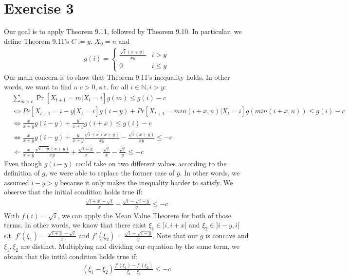 \documentclass[a4paper,german]{article}
\begin{document}
\section*{Exercise 3}
	Our goal is to apply Theorem 9.11, followed by Theorem 9.10. In particular, we define Theorem 9.11's \(C := y\), \(X_0 = n\) and 
	\begin{align*}
		g(i) = \begin{cases}
			\frac{\sqrt i (x+y)}{xy} & i > y \\
			0 & i \leq y
			\end{cases}
	\end{align*}
	Our main concern is to show that Theorem 9.11's inequality holds. In other words, we want to find a \(c > 0\), s.t. for all \(i \in \mathbb{N}, i>y\):
	\begin{align*}
		&\sum_{m>c} \Pr[X_{t+1} = m | X_t = i] g(m) \leq g(i) - c \\
		&\Leftrightarrow Pr[X_{t+1} = i-y|X_t = i] g(i-y) + Pr[X_{t+1} = min(i+x,n) | X_t = i] g(min(i+x,n)) \leq g(i) -c \\
		&\Leftrightarrow \frac{x}{x+y} g(i-y) + \frac{y}{x+y}g(i+x) \leq g(i) -c \\
		&\Leftrightarrow  \frac{x}{x+y} g(i-y) + \frac{y}{x+y}\frac{\sqrt{i+x}(x + y)}{xy} - \frac{\sqrt i (x+y)}{xy}\leq -c \\
		&\Leftarrow \frac{x}{x+y}\frac{\sqrt{i-y}(x+y)}{xy} + \frac{\sqrt{i+x}}{x} - \frac{\sqrt i}{x} - \frac{\sqrt i}{y }\leq -c
	\end{align*}
	Even though \(g(i-y)\) could take on two different values according to the definition of \(g\), we were able to replace the former case of \(g\). In other words, we assumed \(i-y > y\) because it only makes the inequality harder to satisfy. We observe that the initial condition holds true if:
	\begin{align*}
		\frac{\sqrt{i+x} - \sqrt i }{x} - \frac{\sqrt i - \sqrt{i-y}}{y} \leq -c
	\end{align*}
	With \(f(i) = \sqrt i\), we can apply the Mean Value Theorem for both of those terms.  In other words, we know that there exist \(\xi_1 \in ]i, i+x[\) and \(\xi_2 \in ]i-y, i[\) s.t. \(f'(\xi_1) = \frac{\sqrt{i+x} - \sqrt i }{x} \) and \(f'(\xi_2) = \frac{\sqrt i - \sqrt{i-y}}{y}\). Note that our \(g\) is concave and \(\xi_1, \xi_2\) are distinct. Multiplying and dividing our equation by the same term, we obtain that the intial condition holds true if:
	\begin{align*}
		(\xi_1 - \xi_2) \frac{f'(\xi_1) - f'(\xi_2)}{\xi_1 - \xi_2} \leq -c
	\end{align*} 
\end{document}
